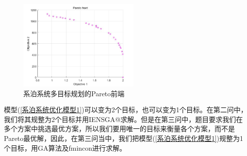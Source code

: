 \documentclass[UTF8]{ctexbook}
\makeatletter
\theoremstyle{nonumberplain}
\newcommand*{\rom}[1]{\expandafter\@slowromancap\romannumeral #1@}
\makeatother
\begin{document}
            \begin{figure}
                \centering
                \includegraphics[width = 6cm]{images/pareto_qiandan.jpg}
                \caption{系泊系统多目标规划的Pareto前端}
                \label{系泊系统多目标规划的Pareto前端}
            \end{figure}
            \par
            模型(\ref{系泊系统优化模型1})可以变为2个目标，也可以变为1个目标。在第二问中，我们将其规整为2个目标并用IENSGA\rom{2}求解。但是在第三问中，题目要求我们在多个方案中挑选最优方案，所以我们要用唯一的目标来衡量各个方案，而不是Pareto最优解，因此，在第三问当中，我们把模型(\ref{系泊系统优化模型1})规整为1个目标，用GA算法及fmincon进行求解。
\end{document}
